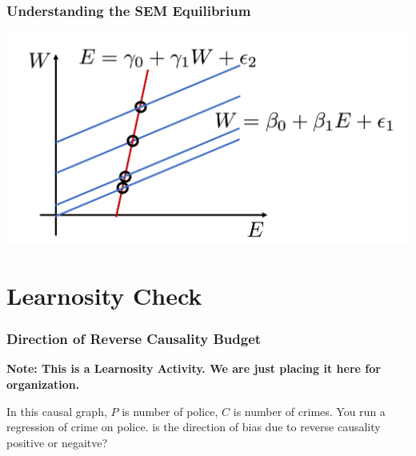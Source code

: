\documentclass[12pt, block=fill]{beamer}
\begin{document}
\begin{frame}
  \frametitle{Understanding the SEM Equilibrium}
   \includegraphics[width =\textwidth]{images/reverse_3}  
\end{frame}





  
\section{Learnosity Check}

\begin{frame}
  \frametitle{Direction of Reverse Causality Budget}

  \textbf{Note: This is a Learnosity Activity. We are just placing it
    here for organization.} 

  In this causal graph, $P$ is number of police, $C$ is number of
  crimes. You run a regression of crime on police.  is the direction
  of bias due to reverse causality positive or negaitve?   
\end{frame}
\end{document}
